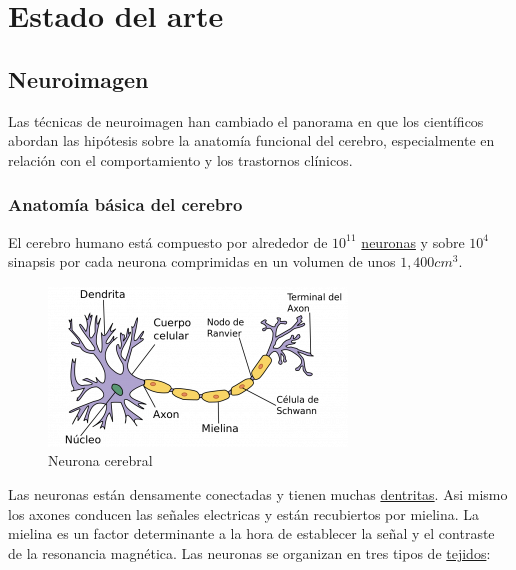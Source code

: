 \chapter{Estado del arte}

\section{Neuroimagen}

Las técnicas de neuroimagen han cambiado el panorama en que los científicos abordan las hipótesis sobre la anatomía funcional del cerebro, especialmente en relación con el comportamiento y los trastornos clínicos. \cite{bold_fmri}

\subsection{Anatomía básica del cerebro}

El cerebro humano está compuesto por alrededor de $10^{11}$ \hyperref[eda:neurona]{neuronas} y sobre $10^{4}$ sinapsis por cada neurona comprimidas en un volumen de unos $1,400cm^{3}$.

\begin{figure}[H]
  \centering
    \includegraphics[scale=0.75]{img/neurona.png}
  \caption{Neurona cerebral}\label{eda:neurona}
\end{figure}

Las neuronas están densamente conectadas y tienen muchas \hyperref[eda:neurona]{dentritas}. Asi mismo los axones conducen las señales electricas y están recubiertos por mielina. La mielina es un factor determinante a la hora de establecer la señal y el contraste de la resonancia magnética. Las neuronas se organizan en tres tipos de \hyperref[eda:tejidos]{tejidos}:

